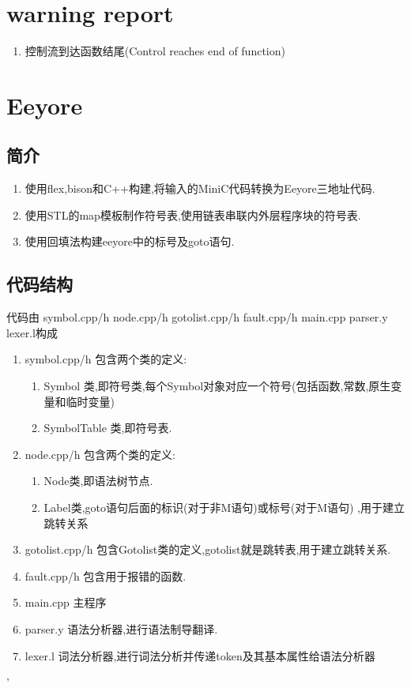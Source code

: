 \documentclass[UTF8]{article}
\begin{document}
\section{warning report}
\begin{enumerate}
\item 控制流到达函数结尾(Control reaches end of function)
\end{enumerate}
\section{Eeyore}
\subsection{简介}
\begin{enumerate}
\item 使用flex,bison和C++构建,将输入的MiniC代码转换为Eeyore三地址代码.
\item 使用STL的map模板制作符号表,使用链表串联内外层程序块的符号表.
\item 使用回填法构建eeyore中的标号及goto语句.
\end{enumerate}
\subsection{代码结构}
代码由 symbol.cpp/h node.cpp/h gotolist.cpp/h fault.cpp/h main.cpp parser.y lexer.l构成
\begin{enumerate}
\item symbol.cpp/h 包含两个类的定义:
\begin{enumerate}[(1)]
\item Symbol 类,即符号类,每个Symbol对象对应一个符号(包括函数,常数,原生变量和临时变量)
\item SymbolTable 类,即符号表.
\end{enumerate}
\item node.cpp/h 包含两个类的定义:
\begin{enumerate}[(1)]
\item Node类,即语法树节点.
\item Label类,goto语句后面的标识(对于非M语句)或标号(对于M语句) ,用于建立跳转关系
\end{enumerate}
\item gotolist.cpp/h 包含Gotolist类的定义,gotolist就是跳转表,用于建立跳转关系.
\item fault.cpp/h 包含用于报错的函数.
\item main.cpp 主程序
\item parser.y 语法分析器,进行语法制导翻译.
\item lexer.l 词法分析器,进行词法分析并传递token及其基本属性给语法分析器
\end{enumerate}'
\end{document}
